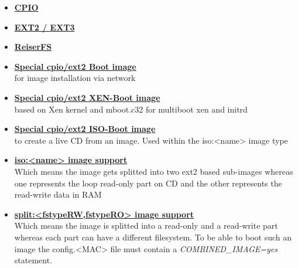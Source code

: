 \begin{itemize}
	\item \textbf{\underline{CPIO}}
	\item \textbf{\underline{EXT2 / EXT3}}
	\item \textbf{\underline{ReiserFS}}
	\item \textbf{\underline{Special cpio/ext2 Boot image}}\\
          for image installation via network
	\item \textbf{\underline{Special cpio/ext2 XEN-Boot image}}\\
          based on Xen kernel
          and mboot.c32 for multiboot xen and initrd
	\item \textbf{\underline{Special cpio/ext2 ISO-Boot image}}\\
          to create a live CD from
          an image. Used within the iso:<name> image type 
	\item \textbf{\underline{iso:<name> image support}}\\
          Which means the image gets
          splitted into two ext2 based sub-images whereas one represents
          the loop read-only part on CD and the other represents the
          read-write data in RAM
	\item \textbf{\underline{split:<fstypeRW,fstypeRO> image support}}\\
          Which means the image is splitted into a read-only and a
          read-write part whereas each part can have a different
          filesystem. To be able to boot such an image the config.<MAC>
          file must contain a \textit{COMBINED\_IMAGE=yes} statement.
\end{itemize}
